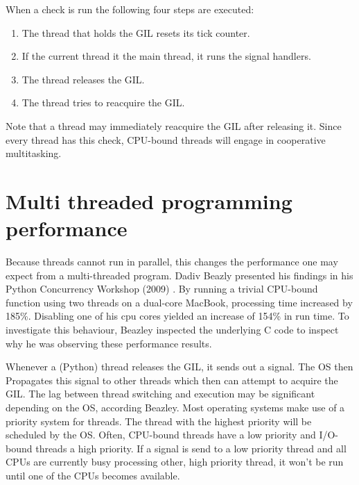 

When a check is run the following four steps are executed:
\begin{enumerate}
	\item The thread that holds the GIL resets its tick counter.
	\item If the current thread it the main thread, it runs the signal handlers.
	\item The thread releases the GIL.
	\item The thread tries to reacquire the GIL.
\end{enumerate}

Note that a thread may immediately reacquire the GIL after releasing it.
Since every thread has this check, CPU-bound threads will engage in cooperative multitasking.

\section{Multi threaded programming performance}
\label{sct:multi_theaded_programming_performance}

Because threads cannot run in parallel, this changes the performance one may expect from a multi-threaded program.
Dadiv Beazly presented his findings in his Python Concurrency Workshop (2009) \cite{beazley2009inside}.
By running a trivial CPU-bound function using two threads on a dual-core MacBook, processing time increased by 185\%.
Disabling one of his cpu cores yielded an increase of 154\% in run time.
To investigate this behaviour, Beazley inspected the underlying C code to inspect why he was observing these performance results.

Whenever a (Python) thread releases the GIL, it sends out a signal.
The OS then Propagates this signal to other threads which then can attempt to acquire the GIL.
The lag between thread switching and execution may be significant depending on the OS, according Beazley.
Most operating systems make use of a priority system for threads. 
The thread with the highest priority will be scheduled by the OS.
Often, CPU-bound threads have a low priority and I/O-bound threads a high priority.
If a signal is send to a low priority thread and all CPUs are currently busy processing other, high priority thread, it won't be run until one of the CPUs becomes available.

